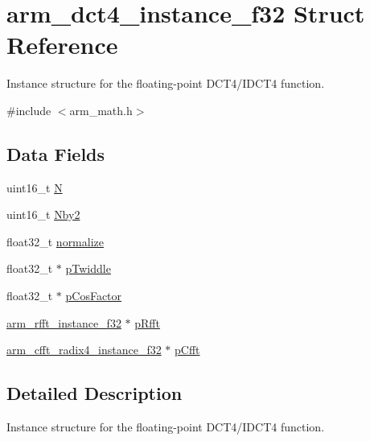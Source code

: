 \hypertarget{structarm__dct4__instance__f32}{\section{arm\-\_\-dct4\-\_\-instance\-\_\-f32 Struct Reference}
\label{structarm__dct4__instance__f32}
}


Instance structure for the floating-\/point D\-C\-T4/\-I\-D\-C\-T4 function.  




{\ttfamily \#include $<$arm\-\_\-math.\-h$>$}

\subsection*{Data Fields}
\begin{DoxyCompactItemize}
\item 
uint16\-\_\-t \hyperlink{structarm__dct4__instance__f32_a37d49571fe35012087153c093705cd11}{N}
\item 
uint16\-\_\-t \hyperlink{structarm__dct4__instance__f32_afa64b1618089e35c2b55cff71cb29715}{Nby2}
\item 
float32\-\_\-t \hyperlink{structarm__dct4__instance__f32_a1bf2ed86ef2c3dd83af606bb3f520f2a}{normalize}
\item 
float32\-\_\-t $\ast$ \hyperlink{structarm__dct4__instance__f32_aca581481fccdff0f557f54a3ef20d967}{p\-Twiddle}
\item 
float32\-\_\-t $\ast$ \hyperlink{structarm__dct4__instance__f32_abd73b9d7fb4951ba086e4820c2a48eb0}{p\-Cos\-Factor}
\item 
\hyperlink{structarm__rfft__instance__f32}{arm\-\_\-rfft\-\_\-instance\-\_\-f32} $\ast$ \hyperlink{structarm__dct4__instance__f32_ad4cd7c85eea3f7c5fff4630bbd979e6a}{p\-Rfft}
\item 
\hyperlink{structarm__cfft__radix4__instance__f32}{arm\-\_\-cfft\-\_\-radix4\-\_\-instance\-\_\-f32} $\ast$ \hyperlink{structarm__dct4__instance__f32_ab7bd4d374a1780dea50efd3e7ac220be}{p\-Cfft}
\end{DoxyCompactItemize}


\subsection{Detailed Description}
Instance structure for the floating-\/point D\-C\-T4/\-I\-D\-C\-T4 function. 


